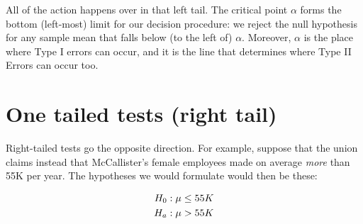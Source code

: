 \documentclass[../../../main.tex]{subfiles}
\begin{document}
\begin{center}
\end{center}

\noindent
All of the action happens over in that left tail. The critical point $\alpha$ forms the bottom (left-most) limit for our decision procedure: we reject the null hypothesis for any sample mean that falls below (to the left of) $\alpha$. Moreover, $\alpha$ is the place where Type I errors can occur, and it is the line that determines where Type II Errors can occur too.


\section{One tailed tests (right tail)}

Right-tailed tests go the opposite direction. For example, suppose that the union claims instead that McCallister's female employees made on average \emph{more} than 55K per year. The hypotheses we would formulate would then be these:

\begin{align*}
  \NullHyp/: \populationmean \leq 55K \\
  \AltHyp/: \populationmean > 55K
\end{align*}
\end{document}
